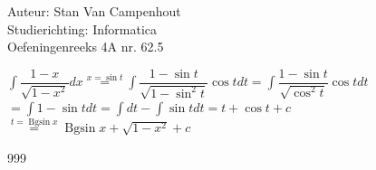 \documentclass[a4paper]{article}
\begin{document}
  
\noindent \large Auteur: Stan Van Campenhout \\
\noindent \large Studierichting:  Informatica\\
\noindent \large Oefeningenreeks 4A nr. 62.5\\

\medskip

\normalsize

$ \displaystyle\int\dfrac{1-x}{\sqrt{1-x^2}}dx \stackrel{x = \sin t}{=} \displaystyle\int\dfrac{1-\sin t}{\sqrt{1-\sin^2t}}\cos tdt
= \displaystyle\int\dfrac{1-\sin t}{\sqrt{\cos^2t}}\cos tdt $\\

$ = \displaystyle\int1 - \sin tdt = \displaystyle\int dt - \displaystyle\int\sin tdt = t + \cos t + c $\\

$ \stackrel{t = \operatorname{Bgsin}x}{=} \operatorname{Bgsin}x + \sqrt{1-x^2} + c $\\

\begin{thebibliography}{999}
\end{thebibliography}
\end{document}
